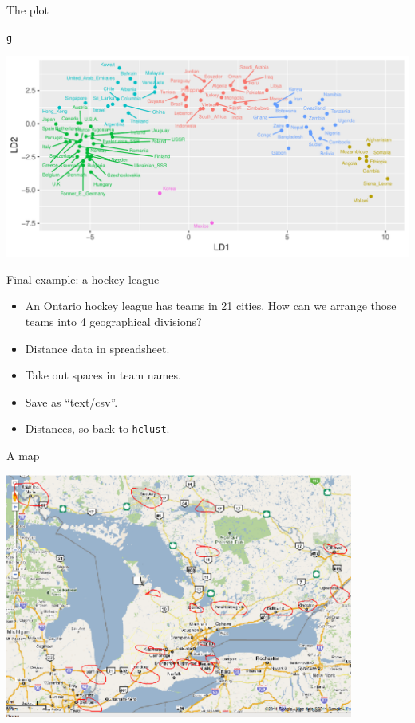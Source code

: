 \documentclass[unknownkeysallowed]{beamer}\usepackage[]{graphicx}\usepackage[]{color}
\makeatletter
\def\maxwidth{ %
  \ifdim\Gin@nat@width>\linewidth
    \linewidth
  \else
    \Gin@nat@width
  \fi
}
\newcommand{\hlstd}[1]{\textcolor[rgb]{0.345,0.345,0.345}{#1}}%
\newenvironment{kframe}{%
 \def\at@end@of@kframe{}%
 \ifinner\ifhmode%
  \def\at@end@of@kframe{\end{minipage}}%
  \begin{minipage}{\columnwidth}%
 \fi\fi%
 \def\FrameCommand##1{\hskip\@totalleftmargin \hskip-\fboxsep
 \colorbox{shadecolor}{##1}\hskip-\fboxsep
     \hskip-\linewidth \hskip-\@totalleftmargin \hskip\columnwidth}%
 \MakeFramed {\advance\hsize-\width
   \@totalleftmargin\z@ \linewidth\hsize
   \@setminipage}}%
 {\par\unskip\endMakeFramed%
 \at@end@of@kframe}
\newenvironment{knitrout}{}{} %
\makeatother
\begin{document}
\begin{frame}[fragile]{The plot}
  
\begin{knitrout}
\color{fgcolor}\begin{kframe}
\begin{alltt}
\hlstd{g}
\end{alltt}
\end{kframe}
\includegraphics[width=\maxwidth]{figure/unnamed-chunk-377-1} 

\end{knitrout}
\end{frame}

\begin{frame}[fragile]{Final example: a hockey league}

  \begin{itemize}
  \item 
An Ontario hockey league has teams in 21 cities. How can we arrange those teams into 4 geographical divisions?
\item Distance data in spreadsheet.
\item Take out spaces in team names.
\item Save as ``text/csv''.
  \item Distances, so back to \texttt{hclust}.


  \end{itemize}
  
\end{frame}

\begin{frame}[fragile]{A map}

\includegraphics[width=4.5in]{map1}
\end{frame}
\end{document}
